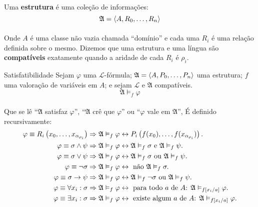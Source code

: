         \paragraph{}
            Uma \textbf{estrutura} é uma coleção de informações:
            $$\mathfrak{A} = \TUPLE{A}{R_0}{\ldots}{R_n}$$
        \paragraph{}
            Onde $A$ é uma classe não vazia chamada ``domínio'' 
            e cada uma $R_i$ é uma relação definida 
            sobre o mesmo. Dizemos que uma estrutura 
            e uma língua são \textbf{compatíveis}
            exatamente quando a aridade de cada $R_i$ 
            é $\rho_i$.

        \begin{definition}{Satisfatibilidade}
                Sejam $\varphi$ uma $\mathcal{L}$-fórmula;  
                $\mathfrak{A} = \TUPLE{A}{P_0}{\ldots}{P_n}$
                uma estrutura;
                $f$ uma valoração de variáveis em $A$; e 
                sejam $\mathcal{L}$ e $\mathfrak{A}$ compatíveis.
                $$ \mathfrak A\vDash_f\varphi$$
            \paragraph{}
                Que se lê  ``$\mathfrak{A}$ satisfaz 
                $\varphi$'', ``$\mathfrak{A}$ crê que 
                $\varphi$'' ou ``$\varphi$ vale em 
                $\mathfrak{A}$'', É definido recursivamente:
            \begin{align*}
                \varphi\equiv R_i\POINT{x_0}{\ldots}{x_{\alpha_{\rho_i}}}
                    &\RAR \mathfrak A\vDash_f\varphi \bim P_i\POINT{f(x_0)}{\ldots}{f(x_{\alpha_{\rho_i}})}.\\
                \varphi\equiv \sigma\land\psi    
                    &\RAR \mathfrak A\vDash_f\varphi \bim \mathfrak A\vDash_f\sigma \text{ e } \mathfrak A\vDash_f\psi.\\
                \varphi\equiv \sigma\lor \psi    
                    &\RAR \mathfrak A\vDash_f\varphi \bim \mathfrak A\vDash_f\sigma \text{ ou } \mathfrak A\vDash_f\psi.\\
                \varphi\equiv \neg\sigma         
                    &\RAR \mathfrak A\vDash_f\varphi \bim \text{ não }\mathfrak A\vDash_f\sigma.\\
                \varphi\equiv \sigma\rar\psi         
                    &\RAR \mathfrak A\vDash_f\varphi \bim \mathfrak A\vDash_f\neg\sigma \text{ ou } \mathfrak A\vDash_f\psi.\\
                \varphi\equiv \forall x_i:\sigma 
                    &\RAR \mathfrak A\vDash_f\varphi \bim \text{ para todo $a$ de $A$: } \mathfrak A\vDash_{f[x_i\slash{a}]}\varphi.\\
                \varphi\equiv \exists x_i:\sigma 
                    &\RAR \mathfrak A\vDash_f\varphi \bim \text{ existe algum $a$ de $A$: } \mathfrak A\vDash_{f[x_i\slash{a}]}\varphi.
            \end{align*}

\end{definition}
